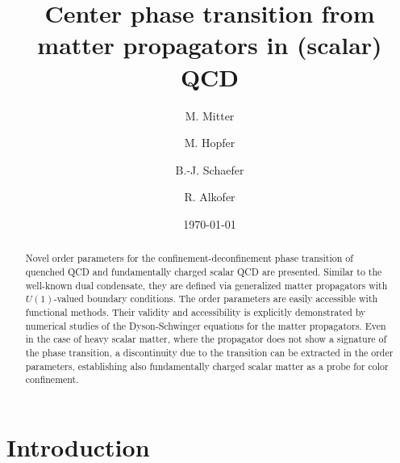 \documentclass[final,twocolumn,merge,sort&compress]{elsarticle}
\begin{document}
\title{Center phase transition from matter propagators in (scalar) QCD}

\author[graz,BNL]{M. Mitter}

\author[graz]{M. Hopfer}

\author[giessen]{B.-J. Schaefer}

\author[graz]{R. Alkofer}

\address[graz]{Institut f\"ur Physik, NAWI Graz,
  Karl-Franzens-Universit\"at Graz, Austria}
\address[BNL]{Department of Physics, Brookhaven National Laboratory, Upton, NY 11973}
\address[giessen]{Institut f\"{u}r Theoretische Physik,
  Justus-Liebig-Universit\"{a}t Gie{\ss}en, Germany}


\date{\today}


\begin{abstract}
  Novel order parameters for the confinement-deconfinement phase
  transition of quenched QCD and fundamentally charged scalar QCD are
  presented. Similar to the well-known dual condensate, they are
  defined via generalized matter propagators with $U(1)$-valued
  boundary conditions. The order parameters are easily accessible with
  functional methods. Their validity and accessibility is explicitly
  demonstrated by numerical studies of the Dyson-Schwinger equations
  for the matter propagators. Even in the case of heavy scalar matter,
  where the propagator does not show a signature of the phase
  transition, a discontinuity due to the transition can be extracted
  in the order parameters, establishing also fundamentally charged
  scalar matter as a probe for color confinement.
\end{abstract}


\maketitle


\section{Introduction}
\label{sec:intro}
\end{document}
